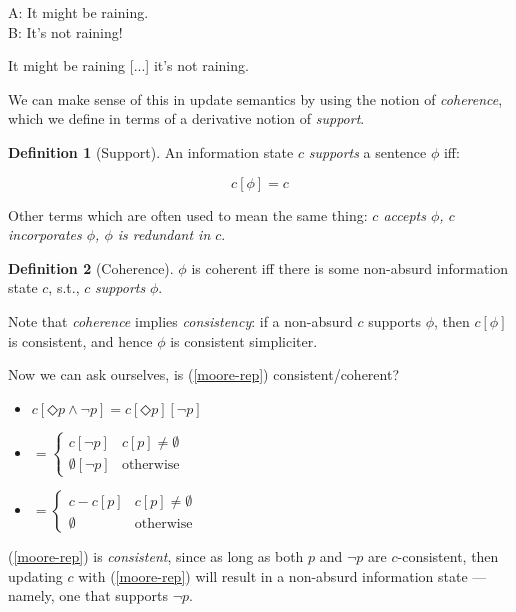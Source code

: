 \documentclass[nols,twoside,nofonts,nobib,nohyper]{tufte-handout}
\theoremstyle{definition}
\newtheorem{definition}{Definition}[section]
\begin{document}
\ex
A: It might be raining.\\
B: It's not raining!
\xe

\ex
It might be raining [...] it's not raining.
\xe

We can make sense of this in update semantics by using the notion of \textit{coherence}, which we define in terms of a derivative notion of \textit{support}.

\begin{definition}[Support]
  An information state $c$ \textit{supports} a sentence $ϕ$ iff:

  $$c[ϕ] = c$$

  Other terms which are often used to mean the same thing: \textit{$c$ accepts $\phi$, $c$ incorporates $\phi$, $ϕ$ is redundant in $c$}.
\end{definition}

\begin{definition}[Coherence]
$ϕ$ is coherent iff there is some non-absurd information state $c$, s.t., $c$ \textit{supports} $ϕ$.
\end{definition}

Note that \textit{coherence} implies \textit{consistency}: if a non-absurd $c$ supports $ϕ$, then $c[ϕ]$ is consistent, and hence $ϕ$ is consistent simpliciter.

Now we can ask ourselves, is (\ref{moore-rep}) consistent/coherent?

\begin{itemize}
    \item $c[◇ p ∧ ¬ p] = c[◇ p][¬ p]$
  \item $= \begin{cases}
    c[¬ p]&c[p] ≠ ∅\\
    ∅[¬ p]&\text{otherwise}
   \end{cases}$
  \item $= \begin{cases}
    c - c[p]&c[p] ≠ ∅\\
    ∅&\text{otherwise}
    \end{cases}$
\end{itemize}

(\ref{moore-rep}) is \textit{consistent}, since as long as both $p$ and $¬ p$ are $c$-consistent, then updating $c$ with (\ref{moore-rep}) will result in a non-absurd information state --- namely, one that supports $¬ p$.
\end{document}
